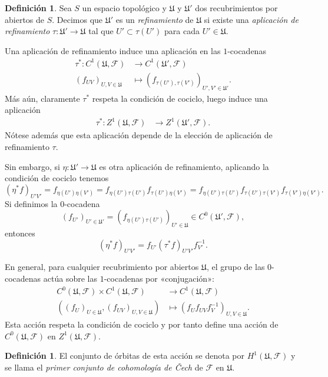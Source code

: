 \documentclass[autocontact]{gaceta}
\theoremstyle{definition} \newtheorem{defn}[thm]{Definición}
\theoremstyle{definition} \newtheorem{ejemplo}[thm]{Ejemplo}
\theoremstyle{definition} \newtheorem{ejercicio}[thm]{Ejercicio}
\def\FF{\mathscr{F}}
\def\UU{\mathfrak{U}}
\begin{document}
    \begin{defn}
      Sea $S$ un espacio topológico y $\UU$ y $\UU'$ dos recubrimientos por abiertos de $S$. Decimos que $\UU'$ es un \emph{refinamiento} de $\UU$ si existe una \emph{aplicación de refinamiento} $\tau:\UU' \rightarrow \UU$ tal que $U'\subset \tau(U')$ para cada $U'\in \UU$.
    \end{defn}

    Una aplicación de refinamiento induce una aplicación en las $1$-cocadenas
    \begin{align*}
      \tau^* :C^1(\UU,\FF)&\longrightarrow C^1(\UU',\FF) \\ 
      (f_{U V})_{U,V \in \UU} &\longmapsto (f_{\tau(U'),\tau(V')})_{U',V' \in \UU'}. 
      \end{align*}
      Más aún, claramente $\tau^*$ respeta la condición de cociclo, luego induce una aplicación
      \begin{align*}
	\tau^* :Z^1(\UU,\FF) &\longrightarrow Z^1(\UU',\FF). 
	\end{align*}
	Nótese además que esta aplicación depende de la elección de aplicación de refinamiento $\tau$. 
	
	Sin embargo, si $\eta:\UU'\rightarrow \UU$ es otra aplicación de refinamiento, aplicando la condición de cociclo tenemos
	\begin{equation*}
	  (\eta^* f)_{U'V'} = f_{\eta(U') \eta(V')} = f_{\eta(U') \tau(U')} f_{\tau(U') \eta(V')} =f_{\eta(U') \tau(U')} f_{\tau(U') \tau(V')}f_{\tau(V') \eta(V')}.
	\end{equation*}
	Si definimos la $0$-cocadena $$(f_{U'})_{U'\in \UU'}= (f_{\eta(U')\tau(U')})_{U'\in \UU} \in C^0(\UU',\FF),$$
	entonces
	\begin{equation*}
	  (\eta^* f)_{U'V'} = f_{U'} (\tau^* f)_{U'V'} f_{V'}^{-1}.
	\end{equation*}

	En general, para cualquier recubrimiento por abiertos $\UU$, el grupo de las $0$-cocadenas actúa sobre las $1$-cocadenas por «conjugación»:
	\begin{align*}
	   C^0(\UU,\FF) \times C^1(\UU, \FF) &\longrightarrow C^1(\UU, \FF) \\ 
	   ( (f_U)_{U\in \UU}, (f_{UV})_{U,V \in \UU} )  &\longmapsto ( f_U f_{UV} f_V^{-1} )_{U,V \in \UU}. 
	  \end{align*}
	  Esta acción respeta la condición de cociclo y por tanto define una acción de $C^0(\UU,\FF)$ en $Z^1(\UU,\FF)$.

	  \begin{defn}
	    El conjunto de órbitas de esta acción se denota por $H^1(\UU,\FF)$ y se llama el \emph{primer conjunto de cohomología de \v{C}ech} de $\FF$ en $\UU$.
	  \end{defn}
\end{document}
